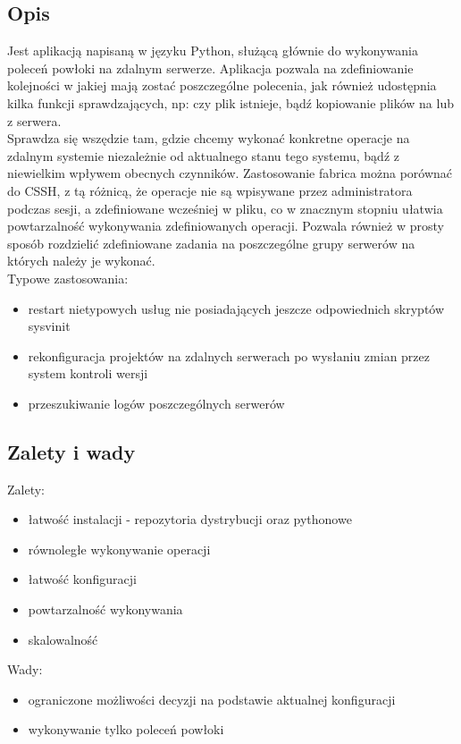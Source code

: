 \subsection{Opis}
Jest aplikacją napisaną w języku Python, służącą głównie do wykonywania poleceń powłoki na zdalnym serwerze. Aplikacja pozwala na zdefiniowanie kolejności w jakiej mają zostać poszczególne polecenia, jak również udostępnia kilka funkcji sprawdzających, np: czy plik istnieje, bądź kopiowanie plików na lub z serwera.\\
Sprawdza się wszędzie tam, gdzie chcemy wykonać konkretne operacje na zdalnym systemie niezależnie od aktualnego stanu tego systemu, bądź z niewielkim wpływem obecnych czynników.
Zastosowanie fabrica można porównać do CSSH, z tą różnicą, że operacje nie są wpisywane przez administratora podczas sesji, a zdefiniowane wcześniej w pliku, co w znacznym stopniu ułatwia powtarzalność wykonywania zdefiniowanych operacji.
Pozwala również w prosty sposób rozdzielić zdefiniowane zadania na poszczególne grupy serwerów na których należy je wykonać.\\
Typowe zastosowania:
\begin{itemize}
\item restart nietypowych usług nie posiadających jeszcze odpowiednich skryptów sysvinit
\item rekonfiguracja projektów na zdalnych serwerach po wysłaniu zmian przez system kontroli wersji
\item przeszukiwanie logów poszczególnych serwerów
\end{itemize}
\subsection{Zalety i wady}
Zalety:
\begin{itemize}
\item łatwość instalacji - repozytoria dystrybucji oraz pythonowe
\item równoległe wykonywanie operacji
\item łatwość konfiguracji
\item powtarzalność wykonywania
\item skalowalność
\end{itemize}
Wady:
\begin{itemize}
\item ograniczone możliwości decyzji na podstawie aktualnej konfiguracji
\item wykonywanie tylko poleceń powłoki
\end{itemize}
